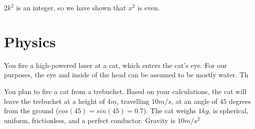 \documentclass[11pt]{exam}
\def\QED{\ensuremath{{\square}}}
\def\markatright#1{\leavevmode\unskip\nobreak\quad\hspace*{\fill}{#1}}
\newenvironment{proof}
  {\begin{trivlist}\item[\hskip\labelsep{\bf Proof.}]}
  {\markatright{\QED}\end{trivlist}}
\begin{document}
\begin{questions}
\begin{proof}
$2k^2$ is an integer, so we have shown that $x^2$ is even.
\end{proof}









\newpage
\section{Physics}

\question You fire a high-powered laser at a cat, which enters the cat's
eye. For our purposes, the eye and inside of the head can be assumed to be mostly
water. Th








\newpage
\question[9] You plan to fire a cat from a trebuchet. Based on your calculations, the cat
will leave the trebuchet at a height of $4m$, travelling $10m/s$, at an angle of
$45$ degrees from the ground ($cos(45) = sin(45) = 0.7$). The cat weighs $1kg$,
is spherical, uniform, frictionless, and a perfect conductor. Gravity is $10m/s^2$


\end{questions}
\end{document}
